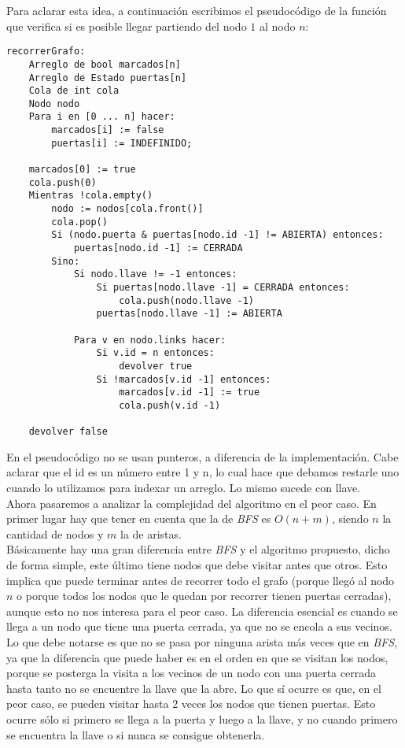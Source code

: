 Para aclarar esta idea, a continuación escribimos el pseudocódigo de la función que verifica si es posible llegar partiendo del nodo $1$ al nodo $n$: \\

\begin{verbatim}
recorrerGrafo:  
    Arreglo de bool marcados[n]
    Arreglo de Estado puertas[n]
    Cola de int cola
    Nodo nodo
    Para i en [0 ... n] hacer:
        marcados[i] := false
        puertas[i] := INDEFINIDO;

    marcados[0] := true
    cola.push(0)
    Mientras !cola.empty()
        nodo := nodos[cola.front()]
        cola.pop()
        Si (nodo.puerta & puertas[nodo.id -1] != ABIERTA) entonces:
            puertas[nodo.id -1] := CERRADA
        Sino:
            Si nodo.llave != -1 entonces:
                Si puertas[nodo.llave -1] = CERRADA entonces:
                    cola.push(nodo.llave -1)
                puertas[nodo.llave -1] := ABIERTA
            
            Para v en nodo.links hacer:
                Si v.id = n entonces:
                	devolver true
                Si !marcados[v.id -1] entonces:
                    marcados[v.id -1] := true
                    cola.push(v.id -1)

    devolver false
\end{verbatim}

En el pseudocódigo no se usan punteros, a diferencia de la implementación. Cabe aclarar que el id es un número entre 1 y n, lo cual hace que debamos restarle uno cuando lo utilizamos para indexar un arreglo. Lo mismo sucede con llave. \\

Ahora pasaremos a analizar la complejidad del algoritmo en el peor caso. En primer lugar hay que tener en cuenta que la de \textit{BFS} es $O(n+m)$, siendo $n$ la cantidad de nodos y $m$ la de aristas. \\

Básicamente hay una gran diferencia entre \textit{BFS} y el algoritmo propuesto, dicho de forma simple, este último tiene nodos que debe visitar antes que otros. Esto implica que puede terminar antes de recorrer todo el grafo (porque llegó al nodo $n$ o porque todos los nodos que le quedan por recorrer tienen puertas cerradas), aunque esto no nos interesa para el peor caso. La diferencia esencial es cuando se llega a un nodo que tiene una puerta cerrada, ya que no se encola a sus vecinos. Lo que debe notarse es que no se pasa por ninguna arista más veces que en \textit{BFS}, ya que la diferencia que puede haber es en el orden en que se visitan los nodos, porque se posterga la visita a los vecinos de un nodo con una puerta cerrada hasta tanto no se encuentre la llave que la abre. Lo que sí ocurre es que, en el peor caso, se pueden visitar hasta 2 veces los nodos que tienen puertas. Esto ocurre sólo si primero se llega a la puerta y luego a la llave, y no cuando primero se encuentra la llave o si nunca se consigue obtenerla. \\

